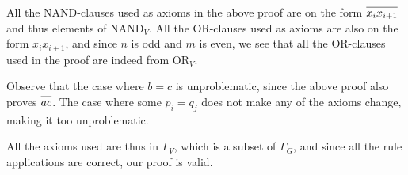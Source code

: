 \begin{figure}[h!]
  \begin{prooftree*}
  \end{prooftree*}
  \caption{}
  \label{fig:general_vel_proof}
\end{figure}

All the NAND-clauses used as axioms in the above proof are on the form $\ol{x_ix_{i+1}}$ and thus elements of $\text{NAND}_V$.
All the OR-clauses used as axioms are also on the form $x_ix_{i+1}$, and since $n$ is odd and $m$ is even, we see that all the OR-clauses used in the proof are indeed from $\text{OR}_V$.

Observe that the case where $b = c$ is unproblematic, since the above proof also proves $\ol{ac}$.
The case where some $p_i = q_j$ does not make any of the axioms change, making it too unproblematic.

All the axioms used are thus in $\Gamma_V$, which is a subset of $\Gamma_G$, and since all the rule applications are correct, our proof is valid.
